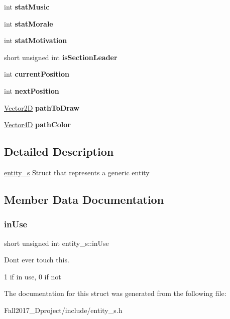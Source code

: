 \begin{DoxyCompactItemize}
int {\bfseries stat\+Music}
\item 
\mbox{\label{structentity__s_a2c53da54831a0732b81e66f768360d19}} 
int {\bfseries stat\+Morale}
\item 
\mbox{\label{structentity__s_a00a4eecd0cd21bc5f180d0ad34ca0a52}} 
int {\bfseries stat\+Motivation}
\item 
\mbox{\label{structentity__s_ac1a74b00351e03aa6c84cdd329af631f}} 
short unsigned int {\bfseries is\+Section\+Leader}
\item 
\mbox{\label{structentity__s_ab55082dfdbae7f56e940f4e827c3fb93}} 
int {\bfseries current\+Position}
\item 
\mbox{\label{structentity__s_ac5ea4d4bbbacc9f59c4d3ddb834bc6b1}} 
int {\bfseries next\+Position}
\item 
\mbox{\label{structentity__s_a30ca61c8a3696e1f7e1243fa434e89e7}} 
\hyperlink{struct_vector2_d}{Vector2D} {\bfseries path\+To\+Draw}
\item 
\mbox{\label{structentity__s_ae4b3f0ab92178d502729d0870770eafb}} 
\hyperlink{struct_vector4_d}{Vector4D} {\bfseries path\+Color}
\end{DoxyCompactItemize}


\subsection{Detailed Description}
\hyperlink{structentity__s}{entity\+\_\+s} Struct that represents a generic entity 

\subsection{Member Data Documentation}
\mbox{\label{structentity__s_ac630363dd06e4f209dfa9b3197f95fc4}} 
\subsubsection{\texorpdfstring{in\+Use}{inUse}}
{\footnotesize\ttfamily short unsigned int entity\+\_\+s\+::in\+Use}



Don\textquotesingle{}t ever touch this. 

1 if in use, 0 if not 

The documentation for this struct was generated from the following file\+:\begin{DoxyCompactItemize}
\item 
Fall2017\+\_\+Dproject/include/entity\+\_\+s.\+h\end{DoxyCompactItemize}
